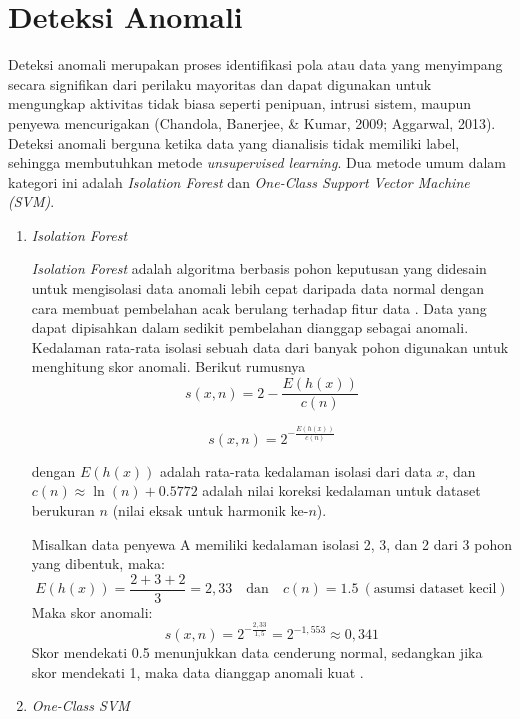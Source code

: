 \section{Deteksi Anomali}\label{sec:anomaly_detection}

{Deteksi anomali} merupakan proses identifikasi pola atau data yang menyimpang secara signifikan dari perilaku mayoritas dan dapat digunakan untuk mengungkap aktivitas tidak biasa seperti penipuan, intrusi sistem, maupun penyewa mencurigakan (Chandola, Banerjee, \& Kumar, 2009; Aggarwal, 2013). Deteksi anomali berguna ketika data yang dianalisis tidak memiliki label, sehingga membutuhkan metode {\it unsupervised learning}. Dua metode umum dalam kategori ini adalah {\it Isolation Forest} dan {\it One-Class Support Vector Machine (SVM)}.
    
    \begin{enumerate}
      \newpage
      \item {{\it Isolation Forest}}
    
      {\it Isolation Forest} adalah algoritma berbasis pohon keputusan yang didesain untuk mengisolasi data anomali lebih cepat daripada data normal dengan cara membuat pembelahan acak berulang terhadap fitur data \cite{liu2008isolation}. Data yang dapat dipisahkan dalam sedikit pembelahan dianggap sebagai anomali. Kedalaman rata-rata isolasi sebuah data dari banyak pohon digunakan untuk menghitung skor anomali. Berikut rumusnya
      \[
      s(x, n) = 2 - \frac{E(h(x))}{c(n)}
      \]

      \[
        s(x, n) = 2^{-\frac{E(h(x))}{c(n)}}
      \]
        
      dengan \(E(h(x))\) adalah rata-rata kedalaman isolasi dari data \(x\), dan \(c(n) \approx \ln(n) + 0{.}5772\) adalah nilai koreksi kedalaman untuk dataset berukuran \(n\) (nilai eksak untuk harmonik ke-\(n\)).
    
      Misalkan data penyewa A memiliki kedalaman isolasi 2, 3, dan 2 dari 3 pohon yang dibentuk, maka:
      \[
      E(h(x)) = \frac{2 + 3 + 2}{3} = 2{,}33
      \quad \text{dan} \quad c(n) = 1{.}5 \ (\text{asumsi dataset kecil})
      \]
      Maka skor anomali:
      \[
        s(x, n) = 2^{-\frac{2,33}{1,5}} = 2^{-1,553} \approx 0,341
      \]
      Skor mendekati 0{.}5 menunjukkan data cenderung normal, sedangkan jika skor mendekati 1, maka data dianggap anomali kuat \cite{liu2008isolation}.
    
      \item {{\it One-Class SVM}}
    

\end{enumerate}
